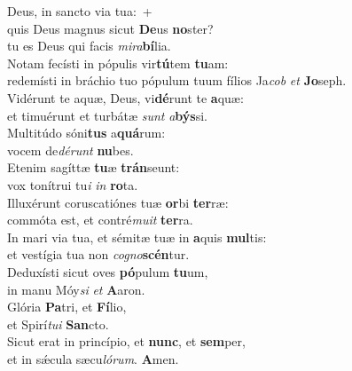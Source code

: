 \oddverse Deus, in sancto via tua:~+\\
\oddverse  quis Deus magnus sicut \textbf{De}us \textbf{no}ster?~\*\\
\oddverse tu es Deus qui facis \textit{mi}\textit{ra}\textbf{bí}lia.\\
\evenverse Notam fecísti in pópulis vir\textbf{tú}tem \textbf{tu}am:~\*\\
\evenverse redemísti in bráchio tuo pópulum tuum fílios Ja\textit{cob} \textit{et} \textbf{Jo}seph.\\
\oddverse Vidérunt te aquæ, Deus, vi\textbf{dé}runt te \textbf{a}quæ:~\*\\
\oddverse et timuérunt et turbátæ \textit{sunt} \textit{a}\textbf{býs}si.\\
\evenverse Multitúdo sóni\textbf{tus} a\textbf{quá}rum:~\*\\
\evenverse vocem de\textit{dé}\textit{runt} \textbf{nu}bes.\\
\oddverse Etenim sagíttæ \textbf{tu}æ \textbf{trán}seunt:~\*\\
\oddverse vox tonítrui tu\textit{i} \textit{in} \textbf{ro}ta.\\
\evenverse Illuxérunt coruscatiónes tuæ \textbf{or}bi \textbf{ter}ræ:~\*\\
\evenverse commóta est, et contré\textit{mu}\textit{it} \textbf{ter}ra.\\
\oddverse In mari via tua, et sémitæ tuæ in \textbf{a}quis \textbf{mul}tis:~\*\\
\oddverse et vestígia tua non \textit{co}\textit{gno}\textbf{scén}tur.\\
\evenverse Deduxísti sicut oves \textbf{pó}pulum \textbf{tu}um,~\*\\
\evenverse in manu Móy\textit{si} \textit{et} \textbf{A}aron.\\
\oddverse Glória \textbf{Pa}tri, et \textbf{Fí}lio,~\*\\
\oddverse et Spirí\textit{tu}\textit{i} \textbf{San}cto.\\
\evenverse Sicut erat in princípio, et \textbf{nunc}, et \textbf{sem}per,~\*\\
\evenverse et in sǽcula sæcu\textit{ló}\textit{rum}. \textbf{A}men.\\
